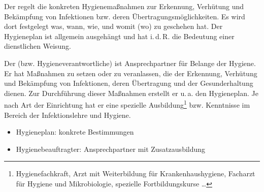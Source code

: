 {%
\label{topic:hygieneplan}
Der  regelt die konkreten Hygienemaßnahmen
zur Erkennung, Verhütung und Bekämpfung von Infektionen bzw.
deren Übertragungsmöglichkeiten. Es wird dort festgelegt
was, wann, wie, und womit (wo) zu geschehen hat. Der
Hygieneplan ist allgemein ausgehängt und hat i.\,d.\,R. die
Bedeutung einer dienstlichen Weisung.

Der   (bzw. Hygieneverantwortliche)
ist Ansprechpartner für Belange der Hygiene. Er hat
Maßnahmen zu setzen oder zu veranlassen, die der Erkennung,
Verhütung und Bekämpfung von Infektionen, deren Übertragung
und der Gesunderhaltung dienen. Zur Durchführung dieser
Maßnahmen erstellt er u.\,a. den Hygieneplan. Je nach Art
der Einrichtung hat er eine spezielle
Ausbildung\footnote{Hygienefachkraft, Arzt mit Weiterbildung
für Krankenhaushygiene, Facharzt für Hygiene und
Mikrobiologie, spezielle Fortbildungskurse \ldots{}} bzw.
Kenntnisse im Bereich der Infektionslehre und Hygiene.



}
{
\begin{itemize}
  \item Hygieneplan: konkrete Bestimmungen
  \item Hygienebeauftragter: Ansprechpartner mit Zusatzausbildung
\end{itemize}
}{}{}{}


